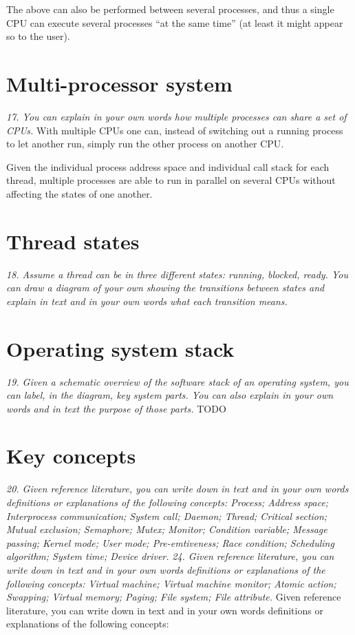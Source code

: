 \documentclass{article}
\begin{document}
The above can also be performed between several processes, and thus a single CPU can execute several processes ``at the same time'' (at least it might appear so to the user).


\section{Multi-processor system}
\emph{17. You can explain in your own words how multiple processes can share a set of CPUs.}
With multiple CPUs one can, instead of switching out a running process to let another run, simply run the other process on another CPU.

Given the individual process address space and individual call stack for each thread, multiple processes are able to run in parallel on several CPUs without affecting the states of one another.


\section{Thread states}
\emph{18. Assume a thread can be in three different states: running, blocked, ready. You can draw a diagram of your own showing the transitions between states and explain in text and in your own words what each transition means.}


\section{Operating system stack}
\emph{19. Given a schematic overview of the software stack of an operating system, you can label, in the diagram, key system parts. You can also explain in your own words and in text the purpose of those parts.}
TODO


\section{Key concepts}
\emph{20. Given reference literature, you can write down in text and in your own words definitions or explanations of the following concepts: Process; Address space; Interprocess communication; System call; Daemon; Thread; Critical section; Mutual exclusion; Semaphore; Mutex; Monitor; Condition variable; Message passing; Kernel mode; User mode; Pre-emtiveness; Race condition; Scheduling algorithm; System time; Device driver.}
\emph{24. Given reference literature, you can write down in text and in your own words definitions or explanations of the following concepts: Virtual machine; Virtual machine monitor; Atomic action; Swapping; Virtual memory; Paging; File system; File attribute.}
Given reference literature, you can write down in text and in your own words definitions or explanations of the following concepts:
\end{document}

